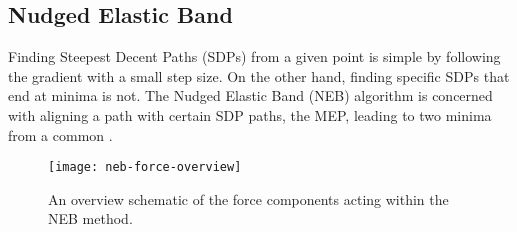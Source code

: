 \subsection{Nudged Elastic Band}
\label{sec:neb}



Finding Steepest Decent Paths (SDPs) from a given point is simple by following the gradient with a small step size.
On the other hand, finding specific SDPs that end at minima is not.
The Nudged Elastic Band (NEB) algorithm is concerned with aligning a path with certain SDP paths, the MEP, leading to two minima from a common .

\begin{figure}[t]
  \begin{center}
    \texttt{[image: neb-force-overview]}
\parbox{0.85\linewidth}{\caption{An overview schematic of the force components acting within the NEB method.
}}
    \label{fig:neb-force-overview}
  \end{center}
\end{figure}

